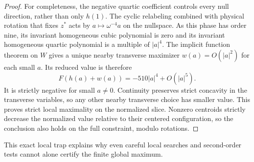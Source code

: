 \documentclass[11pt]{article}
\theoremstyle{remark}
\numberwithin{equation}{section}
\begin{document}
\begin{proof}
For completeness, the negative quartic coefficient controls every
null direction, rather than only $h(1)$.
The cyclic relabeling combined with physical rotation that fixes
$z^*$ acts by $a\mapsto\omega^{-4}a$ on the nullspace.
As this phase has order nine, its invariant homogeneous cubic
polynomial is zero and its invariant homogeneous quartic polynomial
is a multiple of $|a|^4$.
The implicit function theorem on $W$ gives a unique nearby transverse
maximizer $w(a)=O(|a|^2)$ for each small $a$.
Its reduced value is therefore
\[
 F(h(a)+w(a))=-510|a|^4+O(|a|^5).
\]
It is strictly negative for small $a\ne0$.
Continuity preserves strict concavity in the transverse variables,
so any other nearby transverse choice has smaller value.
This proves strict local maximality on the normalized slice.
Nonzero centroids strictly decrease the normalized value relative
to their centered configuration, so the conclusion also holds on
the full constraint, modulo rotations.
\end{proof}

This exact local trap explains why even careful local searches and
second-order tests cannot alone certify the finite global maximum.
\end{document}
